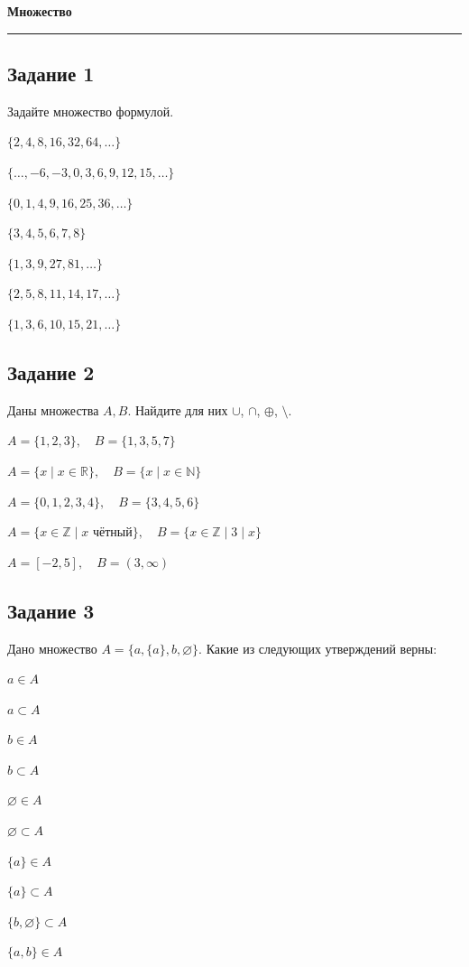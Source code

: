 \documentclass[a4paper,12pt,oneside]{article}
\newcommand{\Task}[1]{%
  \subsection*{#1}%
  \vspace{-0.2\baselineskip}%
}
\begin{document}
\begin{center}
    {\Large\bfseries Множество}\\[2mm]
\end{center}
\vspace{2mm}
\hrule
\vspace{4mm}

\Task{Задание 1}
Задайте множество формулой.
\begin{numlist}
    \item $\{2,4,8,16,32,64,\ldots\}$
    \item $\{\ldots,-6,-3,0,3,6,9,12,15,\ldots\}$
    \item $\{0,1,4,9,16,25,36,\ldots\}$
    \item $\{3,4,5,6,7,8\}$
    \item $\{1,3,9,27,81,\ldots\}$
    \item $\{2,5,8,11,14,17,\ldots\}$
    \item $\{1,3,6,10,15,21,\ldots\}$
\end{numlist}

\Task{Задание 2}
Даны множества $A,B$. Найдите для них $\cup$, $\cap$, $\oplus$, $\setminus$.
\begin{numlist}
    \item $A=\{1,2,3\},\quad B=\{1,3,5,7\}$
    \item $A=\{x \mid x\in\mathbb{R}\},\quad B=\{x \mid x\in\mathbb{N}\}$
    \item $A=\{0,1,2,3,4\},\quad B=\{3,4,5,6\}$
    \item $A=\{x\in\mathbb{Z}\mid x \text{ чётный}\},\quad B=\{x\in\mathbb{Z}\mid 3\mid x\}$
    \item $A=[-2,5],\quad B=(3,\infty)$
\end{numlist}

\Task{Задание 3}
Дано множество $A=\{a,\{a\},b,\varnothing\}$. Какие из следующих утверждений верны:
\begin{numlist}
    \item $a \in A$
    \item $a \subset A$
    \item $b \in A$
    \item $b \subset A$
    \item $\varnothing \in A$
    \item $\varnothing \subset A$
    \item $\{a\}\in A$
    \item $\{a\}\subset A$
    \item $\{b,\varnothing\}\subset A$
    \item $\{a,b\}\in A$
\end{numlist}
\end{document}
